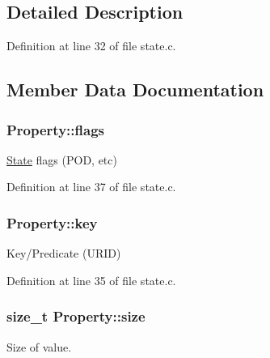 \subsection{Detailed Description}


Definition at line 32 of file state.\+c.



\subsection{Member Data Documentation}
\subsubsection[{\texorpdfstring{flags}{flags}}]{ Property\+::flags}\hypertarget{struct_property_ad71ec64f7699f9b7801e54f57ad2aa96}{}\label{struct_property_ad71ec64f7699f9b7801e54f57ad2aa96}


\hyperlink{struct_state}{State} flags (P\+OD, etc) 



Definition at line 37 of file state.\+c.

\subsubsection[{\texorpdfstring{key}{key}}]{ Property\+::key}\hypertarget{struct_property_a71e1b4425e7276a3861ff902b066df8d}{}\label{struct_property_a71e1b4425e7276a3861ff902b066df8d}


Key/\+Predicate (U\+R\+ID) 



Definition at line 35 of file state.\+c.

\subsubsection[{\texorpdfstring{size}{size}}]{\setlength{\rightskip}{0pt plus 5cm}size\+\_\+t Property\+::size}\hypertarget{struct_property_a4975c4f772ea576ce0fdd12b65036632}{}\label{struct_property_a4975c4f772ea576ce0fdd12b65036632}


Size of value. 



